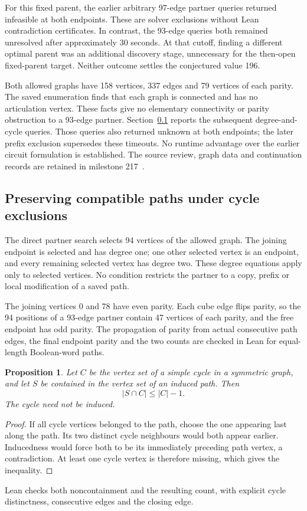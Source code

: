 \documentclass[11pt,a4paper]{article}
\newtheorem{proposition}[theorem]{Proposition}
\theoremstyle{definition}
\theoremstyle{remark}
\begin{document}
For this fixed parent, the earlier arbitrary 97-edge partner queries
returned infeasible at both endpoints. These are solver exclusions
without Lean contradiction certificates. In contrast, the 93-edge
queries both remained unresolved after approximately 30 seconds.
At that cutoff, finding a different optimal parent was an additional
discovery stage, unnecessary for the then-open fixed-parent target.
Neither outcome settles the conjectured value 196.

Both allowed graphs have 158 vertices, 337 edges and 79 vertices of
each parity. The saved enumeration finds that each graph is connected
and has no articulation vertex. These facts give no elementary
connectivity or parity obstruction to a 93-edge partner.
Section~\ref{sec:partner218} reports the subsequent degree-and-cycle
queries. Those queries also returned unknown at both endpoints; the later
prefix exclusion supersedes these timeouts. No runtime advantage over the
earlier circuit formulation is established.
The source review, graph data and continuation records are retained
in milestone 217~\cite{research217}.


\subsection{Preserving compatible paths under cycle exclusions}
\label{sec:partner218}
The direct partner search selects 94 vertices of the allowed graph.
The joining endpoint is selected and has degree one; one other selected
vertex is an endpoint, and every remaining selected vertex has degree two.
These degree equations apply only to selected vertices. No condition
restricts the partner to a copy, prefix or local modification of a saved path.

The joining vertices 0 and 78 have even parity. Each cube edge flips parity,
so the 94 positions of a 93-edge partner contain 47 vertices of each parity,
and the free endpoint has odd parity. The propagation of parity from
actual consecutive path edges, the final endpoint parity and the two
counts are checked in Lean for equal-length Boolean-word paths.

\begin{proposition}\label{prop:cycle-cut218}
Let $C$ be the vertex set of a simple cycle in a symmetric graph, and let
$S$ be contained in the vertex set of an induced path. Then
\[
|S\cap C|\le |C|-1.
\]
The cycle need not be induced.
\end{proposition}
\begin{proof}
If all cycle vertices belonged to the path, choose the one appearing
last along the path. Its two distinct cycle neighbours would both
appear earlier. Inducedness would force both to be its immediately
preceding path vertex, a contradiction. At least one cycle vertex is
therefore missing, which gives the inequality.
\end{proof}
Lean checks both noncontainment and the resulting count, with explicit
cycle distinctness, consecutive edges and the closing edge.
\end{document}
